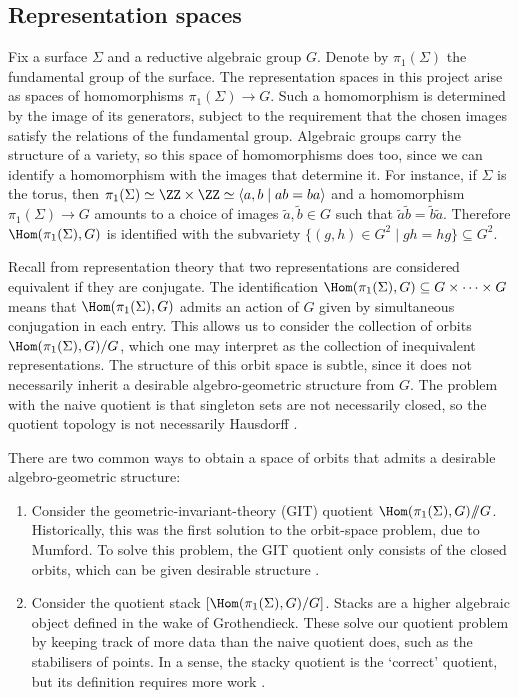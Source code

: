 \documentclass{amsart}
\theoremstyle{plain}
\theoremstyle{definition}
\theoremstyle{remark}
\begin{document}
\subsection*{Representation spaces}
Fix a surface $\Sigma$ and a reductive algebraic group $G$. Denote by $\pi_1(\Sigma)$ the fundamental group of the surface. The representation spaces in this project arise as spaces of homomorphisms $\pi_1(\Sigma)\to G$. Such a homomorphism is determined by the image of its generators, subject to the requirement that the chosen images satisfy the relations of the fundamental group. Algebraic groups carry the structure of a variety, so this space of homomorphisms does too, since we can identify a homomorphism with the images that determine it. For instance, if $\Sigma$ is the torus, then $\pi_1(\Sigma)\simeq \ZZ\times\ZZ \simeq \langle a,b\mid  ab=ba\rangle$ and a homomorphism $\pi_1(\Sigma)\to G$ amounts to a choice of images $\tilde{a},\tilde{b}\in G$ such that $\tilde{a}\tilde{b}=\tilde{b}\tilde{a}$. Therefore $\Hom(\pi_1(\Sigma),G)$ is identified with the subvariety $\{(g,h)\in G^2\mid gh=hg\}\subseteq G^2$. 

Recall from representation theory that two representations are considered equivalent if they are conjugate. The identification $\Hom(\pi_1(\Sigma),G)\subseteq G\times\cdots\times G$ means that $\Hom(\pi_1(\Sigma),G)$ admits an action of $G$ given by simultaneous conjugation in each entry. This allows us to consider the collection of orbits $\Hom(\pi_1(\Sigma),G)/G$, which one may interpret as the collection of inequivalent representations. The structure of this orbit space is subtle, since it does not necessarily inherit a desirable algebro-geometric structure from $G$. The problem with the naive quotient is that singleton sets are not necessarily closed, so the quotient topology is not necessarily Hausdorff \cite[\S3.2.1]{BPGPNT14}. \newpage

There are two common ways to obtain a space of orbits that admits a desirable algebro-geometric structure: 
\begin{enumerate}[\itshape(i)]
\item Consider the geometric-invariant-theory (GIT) quotient $\Hom(\pi_1(\Sigma),G)/\!\!/G$. Historically, this was the first solution to the orbit-space problem, due to Mumford. To solve this problem, the GIT quotient only consists of the closed orbits, which can be given desirable structure \cite[\S3.1]{CF12}. 
\item Consider the quotient stack $[\Hom(\pi_1(\Sigma),G)/G]$. Stacks are a higher algebraic object defined in the wake of Grothendieck. These solve our quotient problem by keeping track of more data than the naive quotient does, such as the stabilisers of points. In a sense, the stacky quotient is the `correct' quotient, but its definition requires more work \cite[\S6.8]{Achar21}.
\end{enumerate}
\end{document}
